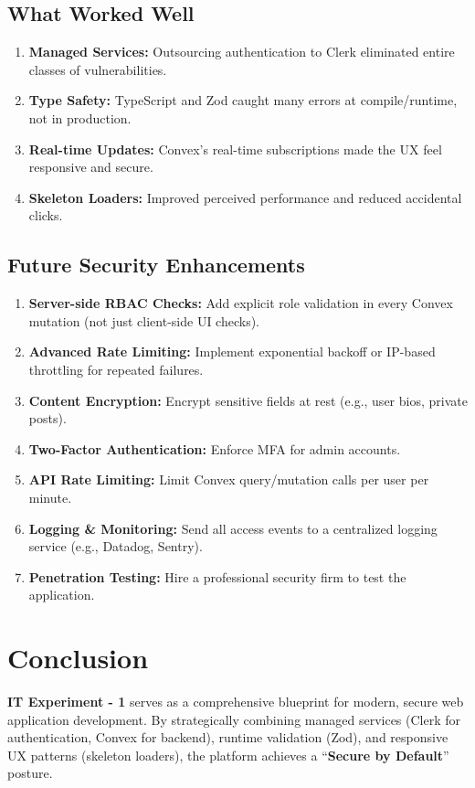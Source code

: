 \documentclass[11pt,a4paper]{article}
\begin{document}
\subsection{What Worked Well}
\begin{enumerate}
    \item \textbf{Managed Services:} Outsourcing authentication to Clerk eliminated entire classes of vulnerabilities.
    \item \textbf{Type Safety:} TypeScript and Zod caught many errors at compile/runtime, not in production.
    \item \textbf{Real-time Updates:} Convex's real-time subscriptions made the UX feel responsive and secure.
    \item \textbf{Skeleton Loaders:} Improved perceived performance and reduced accidental clicks.
\end{enumerate}

\subsection{Future Security Enhancements}
\begin{enumerate}
    \item \textbf{Server-side RBAC Checks:} Add explicit role validation in every Convex mutation (not just client-side UI checks).
    \item \textbf{Advanced Rate Limiting:} Implement exponential backoff or IP-based throttling for repeated failures.
    \item \textbf{Content Encryption:} Encrypt sensitive fields at rest (e.g., user bios, private posts).
    \item \textbf{Two-Factor Authentication:} Enforce MFA for admin accounts.
    \item \textbf{API Rate Limiting:} Limit Convex query/mutation calls per user per minute.
    \item \textbf{Logging \& Monitoring:} Send all access events to a centralized logging service (e.g., Datadog, Sentry).
    \item \textbf{Penetration Testing:} Hire a professional security firm to test the application.
\end{enumerate}

\section{Conclusion}

\textbf{IT Experiment - 1} serves as a comprehensive blueprint for modern, secure web application development. By strategically combining managed services (Clerk for authentication, Convex for backend), runtime validation (Zod), and responsive UX patterns (skeleton loaders), the platform achieves a ``\textbf{Secure by Default}'' posture.
\end{document}
